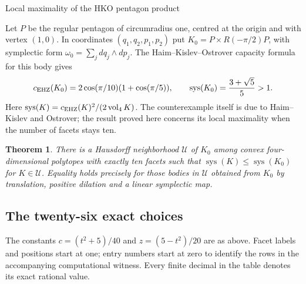 \documentclass[11pt,a4paper]{article}
\newtheorem{theorem}{Theorem}
\begin{document}
\begin{center}\Large Local maximality of the HKO pentagon product\end{center}
Let $P$ be the regular pentagon of circumradius one, centred at the origin
and with vertex $(1,0)$. In coordinates $(q_1,q_2,p_1,p_2)$ put
$K_0=P\times R(-\pi/2)P$, with symplectic form
$\omega_0=\sum_j dq_j\wedge dp_j$.
The Haim--Kislev--Ostrover capacity formula for this body gives
\[
 c_{\rm EHZ}(K_0)=2\cos(\pi/10)(1+\cos(\pi/5)),\qquad
 \operatorname{sys}(K_0)=\frac{3+\sqrt5}{5}>1.
\]
Here $\operatorname{sys}(K)=c_{\rm EHZ}(K)^2/(2\operatorname{vol}_4 K)$.
The counterexample itself is due to Haim--Kislev and Ostrover; the result
proved here concerns its local maximality when the number of facets stays ten.
\begin{theorem}
There is a Hausdorff neighborhood $\mathcal U$ of $K_0$ among convex
four-dimensional polytopes with exactly ten facets such that
$\operatorname{sys}(K)\leq\operatorname{sys}(K_0)$ for $K\in\mathcal U$.
Equality holds precisely for those bodies in $\mathcal U$ obtained from
$K_0$ by translation, positive dilation and a linear symplectic map.
\end{theorem}



\clearpage
\subsection*{The twenty-six exact choices}
The constants $c=(t^2+5)/40$ and $z=(5-t^2)/20$ are as above.
Facet labels and positions start at one; entry numbers start at zero to
identify the rows in the accompanying computational witness.
Every finite decimal in the table denotes its exact rational value.
\begingroup
\small\renewcommand{\arraystretch}{1.25}
\renewcommand{\baselinestretch}{1.2}\selectfont

\endgroup
\end{document}
